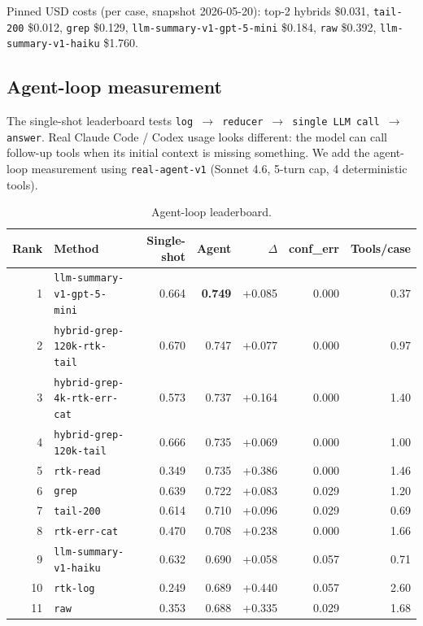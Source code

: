\documentclass{article}
\begin{document}
Pinned USD costs (per case, snapshot 2026-05-20): top-2 hybrids
\$0.031, \texttt{tail-200} \$0.012, \texttt{grep} \$0.129,
\texttt{llm-summary-v1-gpt-5-mini} \$0.184, \texttt{raw} \$0.392,
\texttt{llm-summary-v1-haiku} \$1.760.

\subsection{Agent-loop measurement}
\label{sec:agentloop}

The single-shot leaderboard tests
\texttt{log $\to$ reducer $\to$ single LLM call $\to$ answer}. Real
Claude Code / Codex usage looks different: the model can call
follow-up tools when its initial context is missing something. We
add the agent-loop measurement using \texttt{real-agent-v1} (Sonnet
4.6, 5-turn cap, 4 deterministic tools).

\begin{table}[h]
\centering
\small
\caption{Agent-loop leaderboard.}
\label{tab:agentloop}
\begin{tabular}{rlrrrrr}
\toprule
\textbf{Rank} & \textbf{Method} & \textbf{Single-shot} & \textbf{Agent} & $\Delta$ & \textbf{conf\_err} & \textbf{Tools/case} \\
\midrule
1 & \texttt{llm-summary-v1-gpt-5-mini} & 0.664 & \textbf{0.749} & +0.085 & 0.000 & 0.37 \\
2 & \texttt{hybrid-grep-120k-rtk-tail} & 0.670 & 0.747 & +0.077 & 0.000 & 0.97 \\
3 & \texttt{hybrid-grep-4k-rtk-err-cat}& 0.573 & 0.737 & +0.164 & 0.000 & 1.40 \\
4 & \texttt{hybrid-grep-120k-tail}     & 0.666 & 0.735 & +0.069 & 0.000 & 1.00 \\
5 & \texttt{rtk-read}                  & 0.349 & 0.735 & +0.386 & 0.000 & 1.46 \\
6 & \texttt{grep}                      & 0.639 & 0.722 & +0.083 & 0.029 & 1.20 \\
7 & \texttt{tail-200}                  & 0.614 & 0.710 & +0.096 & 0.029 & 0.69 \\
8 & \texttt{rtk-err-cat}               & 0.470 & 0.708 & +0.238 & 0.000 & 1.66 \\
9 & \texttt{llm-summary-v1-haiku}      & 0.632 & 0.690 & +0.058 & 0.057 & 0.71 \\
10 & \texttt{rtk-log}                  & 0.249 & 0.689 & +0.440 & 0.057 & 2.60 \\
11 & \texttt{raw}                      & 0.353 & 0.688 & +0.335 & 0.029 & 1.68 \\
\bottomrule
\end{tabular}
\end{table}
\end{document}
